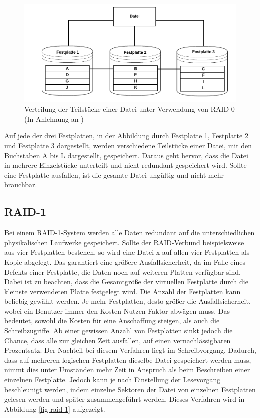 \begin{figure}[H]
  \centering
  \includegraphics[scale=0.3]{resources/Bilder_Kapitel_2/RAID-0.png}
  \caption[Verteilung der Teilstücke einer Datei unter Verwendung von RAID-0]{Verteilung der Teilstücke einer Datei unter Verwendung von RAID-0 (In Anlehnung an \cite[Seite 279]{mandl08})}
  \label{fig-raid-0}
\end{figure}

Auf jede der drei Festplatten, in der Abbildung durch Festplatte 1, Festplatte 2 und Festplatte 3 dargestellt, werden verschiedene Teilstücke einer Datei, mit den Buchstaben A bis L dargestellt, gespeichert.
Daraus geht hervor, dass die Datei in mehrere Einzelstücke unterteilt und nicht redundant gespeichert wird.
Sollte eine Festplatte ausfallen, ist die gesamte Datei ungültig und nicht mehr brauchbar.

\subsection{RAID-1}
Bei einem \ac{RAID}-1-System werden alle Daten redundant auf die unterschiedlichen physikalischen Laufwerke gespeichert.
Sollte der \ac{RAID}-Verbund beispielsweise aus vier Festplatten bestehen, so wird eine Datei x auf allen vier Festplatten als Kopie abgelegt.
Das garantiert eine größere Ausfallsicherheit, da im Falle eines Defekts einer Festplatte, die Daten noch auf weiteren Platten verfügbar sind.
Dabei ist zu beachten, dass die Gesamtgröße der virtuellen Festplatte durch die kleinste verwendeten Platte festgelegt wird\cite[vgl.][Seite 281]{mandl13}.
Die Anzahl der Festplatten kann beliebig gewählt werden.
Je mehr Festplatten, desto größer die Ausfallsicherheit, wobei ein Benutzer immer den Kosten-Nutzen-Faktor abwägen muss.
Das bedeutet, sowohl die Kosten für eine Anschaffung steigen, als auch die Schreibzugriffe.
Ab einer gewissen Anzahl von Festplatten sinkt jedoch die Chance, dass alle zur gleichen Zeit ausfallen, auf einen vernachlässigbaren Prozentsatz.
Der Nachteil bei diesem Verfahren liegt im Schreibvorgang.
Dadurch, dass auf mehreren logischen Festplatten dieselbe Datei gespeichert werden muss, nimmt dies unter Umständen mehr Zeit in Anspruch als beim Beschreiben einer einzelnen Festplatte.
Jedoch kann je nach Einstellung der Lesevorgang beschleunigt werden, indem einzelne Sektoren der Datei von einzelnen Festplatten gelesen werden und später zusammengeführt werden\cite[vgl.][Seite 429 f.]{hert03}.
Dieses Verfahren wird in Abbildung \ref{fig-raid-1} aufgezeigt.

